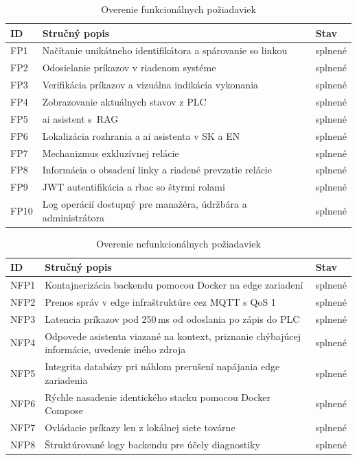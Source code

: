 \begin{table}[H]
\centering
\caption{Overenie funkcionálnych požiadaviek}
\label{tab:test-fp}
\begin{tabular}{|l|p{12cm}|l|}
\hline
\textbf{ID} & \textbf{Stručný popis} & \textbf{Stav} \\
\hline
FP1 & Načítanie unikátneho identifikátora a spárovanie so linkou & splnené \\
FP2 & Odosielanie príkazov v riadenom systéme & splnené \\
FP3 & Verifikácia príkazov a vizuálna indikácia vykonania & splnené \\
FP4 & Zobrazovanie aktuálnych stavov z PLC & splnené \\
FP5 & \acrshort{ai} asistent s~RAG  & splnené \\
FP6 & Lokalizácia rozhrania a \acrshort{ai} asistenta v SK a EN & splnené \\
FP7 & Mechanizmus exkluzívnej relácie & splnené \\
FP8 & Informácia o obsadení linky a riadené prevzatie relácie & splnené \\
FP9 & JWT autentifikácia a \acrshort{rbac} so štyrmi rolami & splnené \\
FP10 & Log operácií dostupný pre manažéra, údržbára a administrátora & splnené \\
\hline
\end{tabular}
\end{table}

\begin{table}[H]
\centering
\caption{Overenie nefunkcionálnych požiadaviek}
\label{tab:test-nfp}
\begin{tabular}{|l|p{12cm}|l|}
\hline
\textbf{ID} & \textbf{Stručný popis} & \textbf{Stav} \\
\hline
NFP1 & Kontajnerizácia backendu pomocou Docker na edge zariadení & splnené \\
NFP2 & Prenos správ v edge infraštruktúre cez MQTT s QoS 1 & splnené \\
NFP3 & Latencia príkazov pod 250\,ms od odoslania po zápis do PLC & splnené \\
NFP4 & Odpovede asistenta viazané na kontext, priznanie chýbajúcej informácie, uvedenie iného zdroja & splnené \\
NFP5 & Integrita databázy pri náhlom prerušení napájania edge zariadenia & splnené \\
NFP6 & Rýchle nasadenie identického stacku pomocou Docker Compose & splnené \\
NFP7 & Ovládacie príkazy len z lokálnej siete továrne & splnené \\
NFP8 & Štruktúrované logy backendu pre účely diagnostiky & splnené \\
\hline
\end{tabular}
\end{table}

